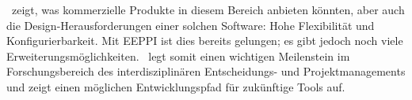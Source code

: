 	\eeppi\ zeigt, was kommerzielle Produkte in diesem Bereich anbieten könnten, 
	aber auch die Design-Herausforderungen einer solchen Software: 
	Hohe Flexibilität und Konfigurierbarkeit. 
	Mit EEPPI ist dies bereits gelungen; es gibt jedoch noch viele Erweiterungsmöglichkeiten. 
	\eeppi\ legt somit einen wichtigen Meilenstein im Forschungsbereich des interdisziplinären Entscheidungs- und Projektmanagements 
	und zeigt einen möglichen Entwicklungspfad für zukünftige Tools auf.
	
	\captionsetup[figure]{labelformat=default} %